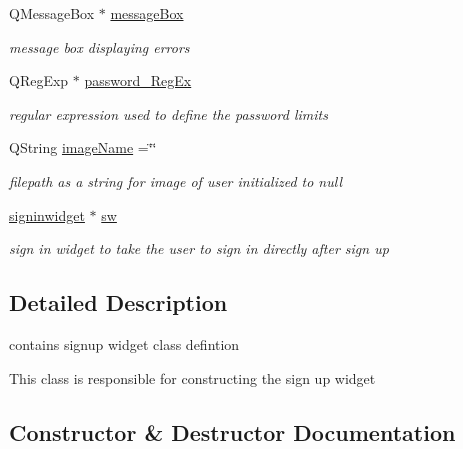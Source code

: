 \begin{DoxyCompactItemize}
\mbox{\label{classsignupwidget_aefc0e695f0cbf575dfdcc6c49746aeeb}} 
Q\+Message\+Box $\ast$ \hyperlink{classsignupwidget_aefc0e695f0cbf575dfdcc6c49746aeeb}{message\+Box}
\begin{DoxyCompactList}\small\item\em message box displaying errors \end{DoxyCompactList}\item 
\mbox{\label{classsignupwidget_aea236de583b2ecc6f8cd0f32c13efc69}} 
Q\+Reg\+Exp $\ast$ \hyperlink{classsignupwidget_aea236de583b2ecc6f8cd0f32c13efc69}{password\+\_\+\+Reg\+Ex}
\begin{DoxyCompactList}\small\item\em regular expression used to define the password limits \end{DoxyCompactList}\item 
\mbox{\label{classsignupwidget_ace15c8c1f9727aec056771f21970138f}} 
Q\+String \hyperlink{classsignupwidget_ace15c8c1f9727aec056771f21970138f}{image\+Name} =\char`\"{}\char`\"{}
\begin{DoxyCompactList}\small\item\em filepath as a string for image of user initialized to null \end{DoxyCompactList}\item 
\mbox{\label{classsignupwidget_ad694d3ea2e0c93e23d76b1444690db89}} 
\hyperlink{classsigninwidget}{signinwidget} $\ast$ \hyperlink{classsignupwidget_ad694d3ea2e0c93e23d76b1444690db89}{sw}
\begin{DoxyCompactList}\small\item\em sign in widget to take the user to sign in directly after sign up \end{DoxyCompactList}\end{DoxyCompactItemize}


\subsection{Detailed Description}
contains signup widget class defintion 

This class is responsible for constructing the sign up widget 

\subsection{Constructor \& Destructor Documentation}
\mbox{\label{classsignupwidget_a1feed302f7dfc610bba7f28efb1ae554}} 
